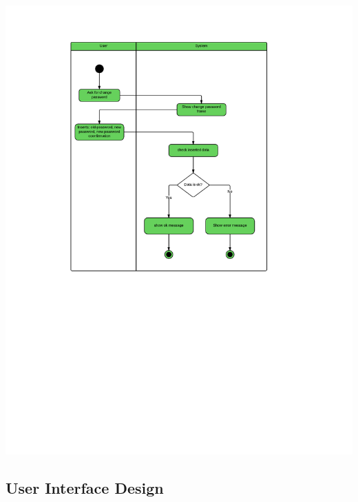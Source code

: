 \includegraphics[scale=0.6]{images/ChangePassword_activity}

\newpage
\subsection{User Interface Design}

